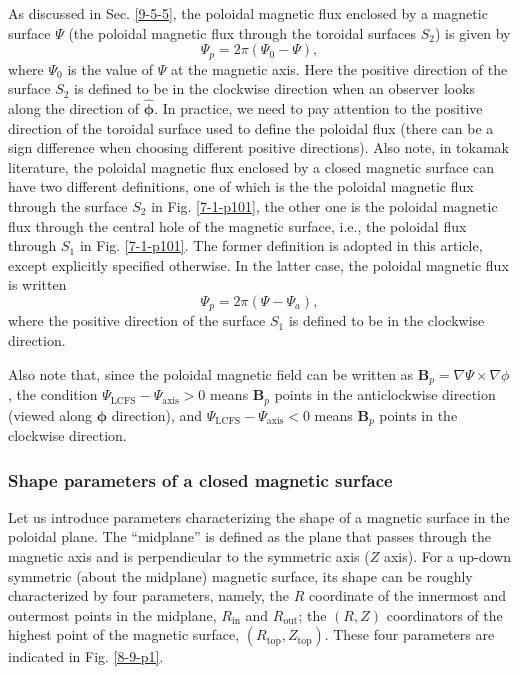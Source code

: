 \documentclass{llncs}
\newcommand{\tmmathbf}[1]{\ensuremath{\boldsymbol{#1}}}
\newcommand{\tmop}[1]{\ensuremath{\operatorname{#1}}}
\begin{document}
As discussed in Sec. \ref{9-5-5}, the poloidal magnetic flux enclosed by a
magnetic surface $\Psi$ (the poloidal magnetic flux through the toroidal
surfaces $S_2$) is given by
\begin{equation}
  \label{12-30-2} \Psi_p = 2 \pi (\Psi_0 - \Psi),
\end{equation}
where $\Psi_0$ is the value of $\Psi$ at the magnetic axis. Here the positive
direction of the surface $S_2$ is defined to be in the clockwise direction
when an observer looks along the direction of $\hat{\tmmathbf{\phi}}$. In
practice, we need to pay attention to the positive direction of the toroidal
surface used to define the poloidal flux (there can be a sign difference when
choosing different positive directions). Also note, in tokamak literature, the
poloidal magnetic flux enclosed by a closed magnetic surface can have two
different definitions, one of which is the the poloidal magnetic flux through
the surface $S_2$ in Fig. \ref{7-1-p101}, the other one is the poloidal
magnetic flux through the central hole of the magnetic surface, i.e., the
poloidal flux through $S_1$ in Fig. \ref{7-1-p101}. The former definition is
adopted in this article, except explicitly specified otherwise. In the latter
case, the poloidal magnetic flux is written
\begin{equation}
  \Psi_p = 2 \pi (\Psi - \Psi_a),
\end{equation}
where the positive direction of the surface $S_1$ is defined to be in the
clockwise direction.

Also note that, since the poloidal magnetic field can be written as
$\mathbf{B}_p = \nabla \Psi \times \nabla \phi$, the condition
$\Psi_{\tmop{LCFS}} - \Psi_{\tmop{axis}} > 0$ means $\mathbf{B}_p$ points in
the anticlockwise direction (viewed along $\tmmathbf{\phi}$ direction), and
$\Psi_{\tmop{LCFS}} - \Psi_{\tmop{axis}} < 0$ means $\mathbf{B}_p$ points in
the clockwise direction.

\subsubsection{Shape parameters of a closed magnetic surface}

Let us introduce parameters characterizing the shape of a magnetic surface in
the poloidal plane. The ``midplane'' is defined as the plane that passes
through the magnetic axis and is perpendicular to the symmetric axis ($Z$
axis). For a up-down symmetric (about the midplane) magnetic surface, its
shape can be roughly characterized by four parameters, namely, the $R$
coordinate of the innermost and outermost points in the midplane,
$R_{\tmop{in}}$ and $R_{\tmop{out}}$; the $(R, Z)$ coordinators of the highest
point of the magnetic surface, $(R_{\tmop{top}}, Z_{\tmop{top}})$. These four
parameters are indicated in Fig. \ref{8-9-p1}.
\end{document}
